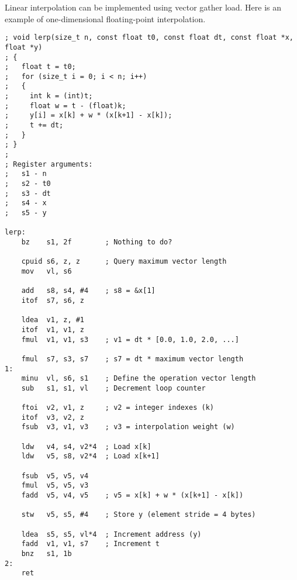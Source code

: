 Linear interpolation can be implemented using vector gather load. Here is an
example of one-dimensional floating-point interpolation.

\begin{lstlisting}[style=assembler]
; void lerp(size_t n, const float t0, const float dt, const float *x, float *y)
; {
;   float t = t0;
;   for (size_t i = 0; i < n; i++)
;   {
;     int k = (int)t;
;     float w = t - (float)k;
;     y[i] = x[k] + w * (x[k+1] - x[k]);
;     t += dt;
;   }
; }
;
; Register arguments:
;   s1 - n
;   s2 - t0
;   s3 - dt
;   s4 - x
;   s5 - y

lerp:
    bz    s1, 2f        ; Nothing to do?

    cpuid s6, z, z      ; Query maximum vector length
    mov   vl, s6

    add   s8, s4, #4    ; s8 = &x[1]
    itof  s7, s6, z

    ldea  v1, z, #1
    itof  v1, v1, z
    fmul  v1, v1, s3    ; v1 = dt * [0.0, 1.0, 2.0, ...]

    fmul  s7, s3, s7    ; s7 = dt * maximum vector length
1:
    minu  vl, s6, s1    ; Define the operation vector length
    sub   s1, s1, vl    ; Decrement loop counter

    ftoi  v2, v1, z     ; v2 = integer indexes (k)
    itof  v3, v2, z
    fsub  v3, v1, v3    ; v3 = interpolation weight (w)

    ldw   v4, s4, v2*4  ; Load x[k]
    ldw   v5, s8, v2*4  ; Load x[k+1]

    fsub  v5, v5, v4
    fmul  v5, v5, v3
    fadd  v5, v4, v5    ; v5 = x[k] + w * (x[k+1] - x[k])

    stw   v5, s5, #4    ; Store y (element stride = 4 bytes)

    ldea  s5, s5, vl*4  ; Increment address (y)
    fadd  v1, v1, s7    ; Increment t
    bnz   s1, 1b
2:
    ret
\end{lstlisting}


\twocolumn
